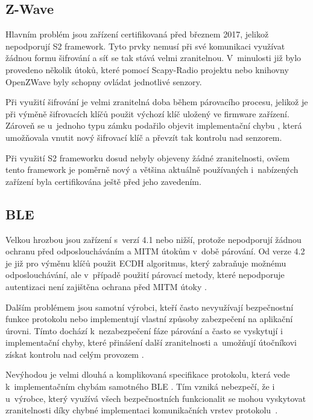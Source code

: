  \subsection{Z-Wave}
 Hlavním problém jsou zařízení certifikovaná před březnem 2017, jelikož nepodporují S2 framework.
 Tyto prvky nemusí při své komunikaci využívat žádnou formu šifrování a síť se tak stává 
 velmi zranitelnou. V~minulosti již bylo provedeno několik útoků, které pomocí
 Scapy-Radio projektu \cite{ezwave} nebo knihovny OpenZWave  byly schopny ovládat jednotlivé senzory. 
 
 Při využití šifrování je velmi zranitelná doba během párovacího procesu, jelikož je při výměně
 šifrovacích klíčů použit výchozí klíč uložený ve firmware zařízení. Zároveň se 
 u~jednoho typu zámku podařilo objevit implementační chybu \cite{zwave-S0-attack}, která umožňovala vnutit 
 nový šifrovací klíč a převzít tak kontrolu nad senzorem. 
 
 Při využití S2 frameworku dosud nebyly objeveny žádné zranitelnosti, ovšem tento
 framework je poměrně nový a většina aktuálně používaných i~nabízených zařízení byla certifikována 
 ještě před jeho zavedením.
 
 \subsection{BLE}
 Velkou hrozbou jsou zařízení s~verzí 4.1 nebo nižší, protože nepodporují žádnou ochranu před 
 odposloucháváním a MITM útokům v~době párování. Od verze 4.2 je již pro výměnu klíčů použit ECDH 
 algoritmus, který zabraňuje možnému odposlouchávání, ale v~případě použití párovací metody, které
 nepodporuje autentizaci není zajištěna ochrana před MITM útoky \cite{cesnet-survey}.
 
 Dalším problémem jsou samotní výrobci, kteří často nevyužívají bezpečnostní funkce protokolu  \cite{ble-locks} nebo
 implementují vlastní způsoby zabezpečení na aplikační úrovni. Tímto dochází k~nezabezpečení fáze 
 párování a často se vyskytují i implementační chyby, které přinášení další zranitelnosti \cite{ble-attack} 
 a~umožňují útočníkovi získat kontrolu nad celým provozem  \cite{cesnet-survey}.
 
 Nevýhodou je velmi dlouhá a komplikovaná specifikace protokolu, která vede k~implementačním 
 chybám samotného BLE \cite{blueborne}. Tím vzniká nebezpečí, že i u~výrobce, který využívá
 všech bezpečnostních funkcionalit
 se mohou vyskytovat zranitelnosti díky chybné implementaci komunikačních vrstev protokolu~\cite{cesnet-survey}.
 
